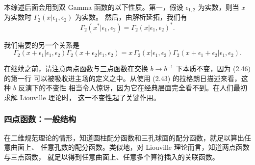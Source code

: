 %

本综述后面会用到双 Gamma 函数的以下性质。第一，假设 $\epsilon_{1,2}$ 为实数，则当 $x$ 为实数时
$\Gamma_2(x|\epsilon_1,\epsilon_2)$ 为实数。
然后，由解析延拓，我们有
\begin{equation}
  \Gamma_2(x^*|\epsilon_1,\epsilon_2) = \Gamma_2(x|\epsilon_1,\epsilon_2)^*.
  \tag{2.50}
\end{equation}

我们需要的另一个关系是
\begin{equation}
  \Gamma_2(x+\epsilon_1|\epsilon_1,\epsilon_2)\Gamma_2(x+\epsilon_2|\epsilon_1,\epsilon_2)
  = x\,\Gamma_2(x|\epsilon_1,\epsilon_2)\Gamma_2(x+\epsilon_1+\epsilon_2|\epsilon_1,\epsilon_2).
  \tag{2.51}
\end{equation}


在继续之前，请注意两点函数与三点函数在交换 $b\to b^{-1}$ 下本质不变，因为 (2.46) 的第一行
可以被吸收进主场的定义之中。从使用 (2.43) 的拉格朗日描述来看，这种 $b$ 反演下的不变性
相当令人惊讶，因为它在经典层面完全看不到。在人们最初求解 Liouville 理论时，
这一不变性起了关键作用。


\subsubsection{四点函数：一般结构}

在二维规范理论的情形，知道圆柱配分函数和三孔球面的配分函数，就足以算出任意曲面上、
任意孔数的配分函数。类似地，对 Liouville 理论而言，知道两点函数与三点函数，
就足以得到任意曲面上、任意多个算符插入的关联函数。

